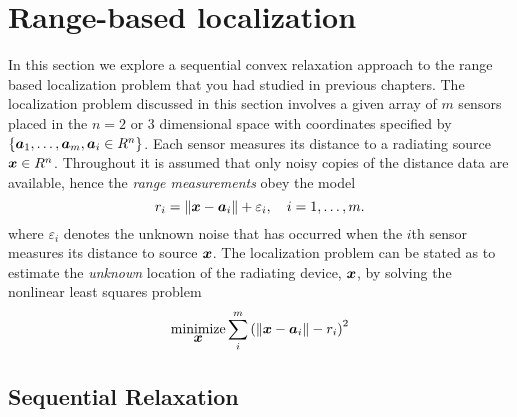 \newpage

\section{Range-based localization}


In this section we explore a sequential convex relaxation approach to the range based localization problem that you had studied in previous chapters. The localization problem discussed in this section involves a given array of $m$ sensors placed in the $n = 2$ or 3 dimensional space with coordinates specified by $\{\mbox{\boldmath$a$}_1,\ldots, \mbox{\boldmath$a$}_m, \mbox{\boldmath$a$}_i\in R^n\}$. Each sensor measures its distance to a radiating source $\mbox{\boldmath$x$}\in R^n$. Throughout it is assumed that only noisy copies of the distance data are available, hence the \textit{range measurements} obey the model
\setcounter{abc}{0}
\begin{equation} \label{eq:5.0}
\nonumber
r_i = \|{\mbox{\boldmath$x$}} - {\mbox{\boldmath$a$}}_i\| + \varepsilon_i, \quad i = 1, \ldots , m.
\end{equation}    
where $\varepsilon_i$ denotes the unknown noise that has occurred when the $i$th sensor measures its distance to source $\mbox{\boldmath$x$}$. %
The localization problem can be stated as to  estimate the \textit{unknown} location of the radiating device, $\mbox{\boldmath$x$}$, by solving the nonlinear least squares problem 
\setcounter{abc}{0}
\begin{equation} \label{eq:5.1}
\mathop{\mbox{minimize}}_{\mbox{\boldmath$x$}} \sum^m_i \left( \|\mbox{\boldmath$x$} - \mbox{\boldmath$a$}_i\| - r_i \right)^2 
\end{equation}

\subsection{Sequential Relaxation}

